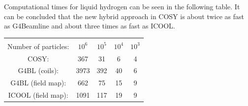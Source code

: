 \documentclass[portrait,a0paper,fontscale=0.285]{baposter} %
\begin{document}
\begin{poster}
{Computational times for liquid hydrogen can be seen in the following table. It can be concluded that the new hybrid approach in COSY is about twice as fast as G4Beamline and about three times as fast as ICOOL.
\begin{center}
\begin{tabularx}{\columnwidth}{ccccc}
\hline \hline \vspace*{-10pt} \\
Number of particles: & $10^6$ & $10^5$ & $10^4$ & $10^3$\\
\hline
COSY: & 367 & 31 & 6 & 4\\
G4BL (coils): & 3973 & 392 & 40 & 6\\
G4BL (field map): & 662 & 75 & 15 & 9\\
ICOOL (field map): & 1091 & 117 & 19 & 9\\
\hline
\end{tabularx}
\end{center}
}

\end{poster}
\end{document}
